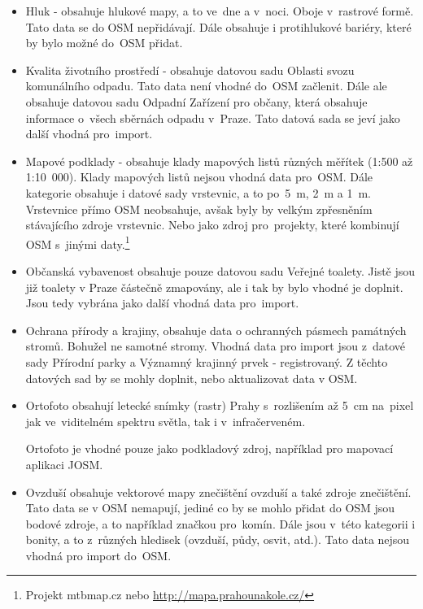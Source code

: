 \begin{itemize}
    \item   Hluk - obsahuje hlukové mapy, a to ve~dne a v~noci. Oboje
            v~rastrové formě. Tato data se do OSM nepřidávají. Dále
            obsahuje i protihlukové bariéry, které by bylo možné
            do~OSM přidat.

    \item   Kvalita životního prostředí - obsahuje datovou sadu
            Oblasti svozu komunálního odpadu. Tato data není vhodné
            do~OSM začlenit. Dále ale obsahuje datovou sadu
            Odpadní Zařízení pro občany, která obsahuje informace
            o~všech sběrnách odpadu v~Praze. Tato datová sada se jeví
            jako další vhodná pro~import.

    \item   Mapové podklady - obsahuje klady mapových listů různých
            měřítek (1:500 až 1:10~000). Klady mapových listů nejsou
            vhodná data pro~OSM. Dále kategorie obsahuje i datové sady
            vrstevnic, a to po~5~m, 2~m a 1~m. Vrstevnice přímo OSM
            neobsahuje, avšak byly by velkým zpřesněním stávajícího
            zdroje vrstevnic. Nebo jako zdroj pro~projekty, které
            kombinují OSM s~jinými daty.\footnote{Projekt mtbmap.cz nebo \url{http://mapa.prahounakole.cz/}}

    \item   Občanská vybavenost obsahuje pouze datovou sadu Veřejné
            toalety. Jistě jsou již toalety v Praze částečně
            zmapovány, ale i tak by bylo vhodné je doplnit. Jsou tedy
            vybrána jako další vhodná data pro~import.

    \item   Ochrana přírody a krajiny, obsahuje data o ochranných
            pásmech památných stromů. Bohužel ne samotné stromy.
            Vhodná data pro import jsou z~datové sady Přírodní parky a
            Významný krajinný prvek - registrovaný. Z těchto datových
            sad by se mohly doplnit, nebo aktualizovat data v OSM.

    \item   Ortofoto obsahují letecké snímky (rastr) Prahy 
            s~rozlišením až 5~cm na~pixel jak ve~viditelném spektru
            světla, tak i v~infračerveném.

            Ortofoto je vhodné pouze jako podkladový zdroj,
            například pro mapovací aplikaci JOSM.

    \item   Ovzduší obsahuje vektorové mapy znečištění ovzduší a také
            zdroje znečištění. Tato data se v OSM nemapují, jediné co
            by se mohlo přidat do OSM jsou bodové zdroje, a to
            například značkou pro~komín. Dále jsou v~této kategorii i
            bonity, a to z~různých hledisek (ovzduší, půdy,
            osvit, atd.). Tato data nejsou vhodná pro import do~OSM.


\end{itemize}

